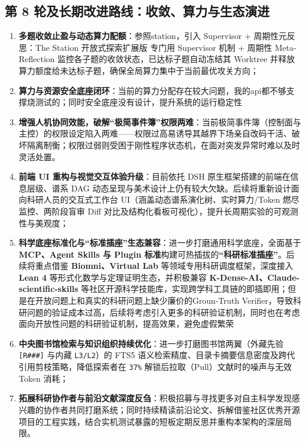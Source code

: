 \documentclass[11pt,a4paper]{ctexart}
\theoremstyle{remark}
\begin{document}
\subsection{第 8 轮及长期改进路线：收敛、算力与生态演进}
\begin{enumerate}
    \item \textbf{多题收敛止盈与动态算力配额}：参照station，引入 Supervisor + 周期性元反思：The Station 开放式探索扩展版 专门用 Supervisor 机制 + 周期性 Meta-Reflection 监控各子题的收敛状态，已达标子题自动冻结其 Worktree 并释放算力额度给未达标子题，确保全局算力集中于当前最优攻关方向；
    \item \textbf{算力与资源安全底座闭环}：当前的算力分配存在较大问题，我的api都不够支撑烧测试的；同时安全底座没有设计，提升系统的运行稳定性
    \item \textbf{增强人机协同效能，破解“极简事件簿”权限两难}：当前极简事件簿（控制面与主控）的权限设定陷入两难——权限过高易诱导其越界下场亲自改码干活、破坏隔离制衡；权限过弱则受困于刚性程序状态机，在面对突发异常时难以及时灵活处置。
    \item \textbf{前端 UI 重构与视觉交互体验升级}：目前依托 DSH 原生框架搭建的前端在信息层级、谱系 DAG 动态呈现与美术设计上仍有较大欠缺。后续将重新设计面向科研人员的交互式工作台 UI（涵盖动态谱系演化树、实时算力/Token 燃尽监控、两阶段盲审 Diff 对比及结构化看板可视化），提升长周期实验的可观测性与美观度；
    \item \textbf{科学底座标准化与“标准插座”生态兼容}：进一步打磨通用科学底座，全面基于 \textbf{MCP、Agent Skills 与 Plugin 标准}构建可热插拔的\textbf{“科研标准插座”}。后续将重点借鉴 \textbf{Biomni、Virtual Lab} 等领域专用科研调度框架，深度接入 \textbf{Lean 4} 等形式化数学与定理证明生态，并积极兼容 \textbf{K-Dense-AI、Claude-scientific-skills} 等社区开源科学技能库，实现跨学科工具链的即插即用；但是在开放问题上和真实的科研问题上缺少廉价的Groun-Truth Verifier，导致科研问题的验证成本过高，后续将考虑引入更多的科研验证机制，同时也在考虑面向开放性问题的科研验证机制，提高效果，避免虚假繁荣
    \item \textbf{中央图书馆检索与知识组织持续优化}：进一步打磨图书馆两翼（外藏先验 \texttt{[R\#\#\#]} 与内藏 \texttt{L3/L2}）的 FTS5 语义检索精度、目录卡摘要信息密度及跨代引用剪枝策略，降低探索者在 \texttt{37\%} 解锁后拉取（Pull）文献时的噪声与无效 Token 消耗；
    \item \textbf{拓展科研协作者与前沿文献深度反刍}：积极招募与寻找更多对自主科学发现感兴趣的协作者共同打磨系统；同时持续精读前沿论文、拆解借鉴社区优秀开源项目的工程实践，结合实机测试暴露的短板定期反思并重构本架构的深层局限。
\end{enumerate}



\end{document}
